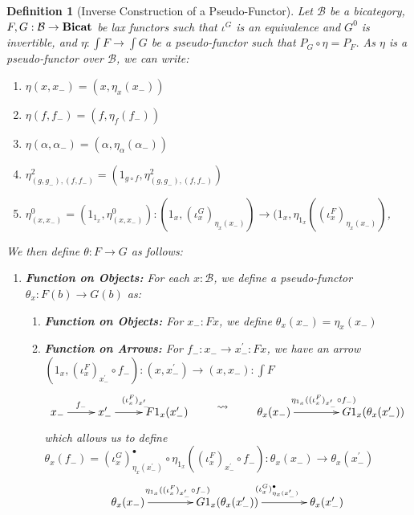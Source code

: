 \documentclass{article}
\numberwithin{equation}{section}
\theoremstyle{definition}
\theoremstyle{plain}
\newtheorem{definition}[equation]{Definition}
\newcommand{\Bicat}{\textnormal{\textbf{Bicat}}}
\begin{document}
\begin{definition}[Inverse Construction of a Pseudo-Functor] Let $\mathcal{B}$ be a bicategory, $F,G: \mathcal{B} \to \Bicat$ be lax functors such that $\iota^G$ is an equivalence and $G^0$ is invertible, and $\eta: \int F \to \int G$ be a pseudo-functor such that $P_G \circ \eta = P_F$. As $\eta$ is a pseudo-functor over $\mathcal{B}$, we can write:
	\begin{enumerate}[label = $\bullet$]
		\item $\eta(x,x_-) = (x,\eta_x(x_-))$
		\item $\eta(f,f_-) = (f,\eta_f(f_-))$
		\item $\eta(\alpha, \alpha_-) = (\alpha, \eta_{\alpha}(\alpha_-))$
		\item $\eta^2_{(g,g_-),(f,f_-)} = (1_{g\circ f}, \eta^2_{(g,g_-),(f,f_-)})$
		\item $\eta^0_{(x,x_-)} = (1_{1_x}, \eta^0_{(x,x_-)}): (1_x, (\iota^G_x)_{\eta_x(x_-)}) \to (1_x, \eta_{1_x}((\iota^F_x)_{\eta_x(x_-)})$, 
	\end{enumerate}
	
	We then define $\theta: F \to G$ as follows:
	\begin{enumerate}[label = $\bullet$]
		\item \textbf{Function on Objects:} For each $x:\mathcal{B}$, we define a pseudo-functor $\theta_x: F(b) \to G(b)$ as:
		\begin{enumerate}
			\item \textbf{Function on Objects:} For $x_-:Fx$, we define $\theta_x(x_-) = \eta_x(x_-)$
			\item \textbf{Function on Arrows:} For $f_-:x_- \to x_-^{\prime}:Fx$, we have an arrow $(1_x,(\iota^F_x)_{x_-^{\prime}}\circ f_-):(x,x_-^{\prime}) \to (x,x_-):\int F$
			\[\vcenter{\xymatrix{
					x_- \ar[r]^{f_-} & x_-^{\prime} \ar[r]^{(\iota^F_x)_{x_-^{\prime}}} & F1_x(x_-^{\prime})
			}}
			\qquad \leadsto \qquad
			\vcenter{\xymatrix@C=4em{
					\theta_x(x_-) \ar[r]^{\eta_{1_x}((\iota^F_x)_{x_-^{\prime}}\circ f_-)} & G1_x(\theta_x(x_-^{\prime}))
			}}\]
			which allows us to define $\theta_x(f_-) = (\iota^G_x)^{\bullet}_{\eta_x(x_-^{\prime})} \circ \eta_{1_x}((\iota^F_x)_{x_-^{\prime}}\circ f_-): \theta_x(x_-) \to \theta_x(x_-^{\prime})$
			\[\xymatrix@C=4em{
				\theta_x(x_-) \ar[r]^{\eta_{1_x}((\iota^F_x)_{x_-^{\prime}}\circ f_-)} & G1_x(\theta_x(x_-^{\prime})) \ar[r]^{(\iota^G_x)^{\bullet}_{\eta_x(x_-^{\prime})}} & \theta_x(x_-^{\prime})
			}\]
			

\end{enumerate}
\end{enumerate}
\end{definition}
\end{document}
